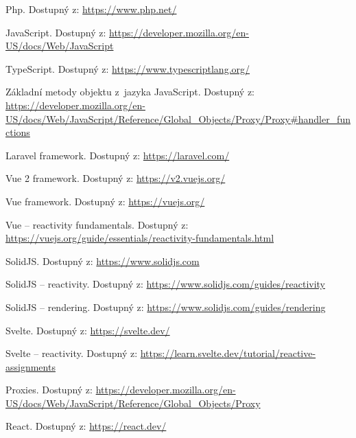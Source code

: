 \documentclass[
  master,
  program=ainf,
  tables=false,
  sourcecodes,
  glossaries,
  index
]{kidiplom}
\begin{document}



\nocite{*}

\begin{thebibliography}{9}
   Php. Dostupný z: \url{https://www.php.net/}

   JavaScript. Dostupný z: \url{https://developer.mozilla.org/en-US/docs/Web/JavaScript}

   TypeScript. Dostupný z: \url{https://www.typescriptlang.org/}
  
   Základní metody objektu z~jazyka JavaScript. Dostupný z: \url{https://developer.mozilla.org/en-US/docs/Web/JavaScript/Reference/Global_Objects/Proxy/Proxy#handler_functions}

   Laravel framework. Dostupný z: \url{https://laravel.com/}

   Vue 2 framework. Dostupný z: \url{https://v2.vuejs.org/}

   Vue framework. Dostupný z: \url{https://vuejs.org/}

   Vue -- reactivity fundamentals. Dostupný z: \url{https://vuejs.org/guide/essentials/reactivity-fundamentals.html}
  
   SolidJS. Dostupný z: \url{https://www.solidjs.com}

   SolidJS -- reactivity. Dostupný z: \url{https://www.solidjs.com/guides/reactivity}
  
   SolidJS -- rendering. Dostupný z: \url{https://www.solidjs.com/guides/rendering}
  
   Svelte. Dostupný z: \url{https://svelte.dev/}

   Svelte -- reactivity. Dostupný z: \url{https://learn.svelte.dev/tutorial/reactive-assignments}
   
   Proxies. Dostupný z: \url{https://developer.mozilla.org/en-US/docs/Web/JavaScript/Reference/Global_Objects/Proxy}

   React. Dostupný z: \url{https://react.dev/}
\end{thebibliography}

\printindex
\end{document}
